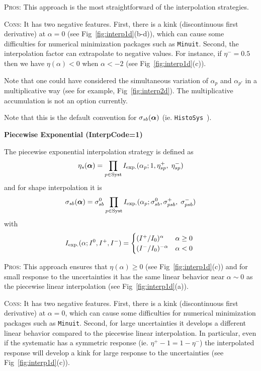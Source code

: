 \documentclass{cernrep}
\def\vec#1{\ifmmode
\mathchoice{\mbox{\boldmath$\displaystyle\bf#1$}}
{\mbox{\boldmath$\textstyle\bf#1$}}
{\mbox{\boldmath$\scriptstyle\bf#1$}}
{\mbox{\boldmath$\scriptscriptstyle\bf#1$}}\else
{\mbox{\boldmath$\bf#1$}}\fi}
\newcommand{\HS}{\texttt{HistoSys}}
\begin{document}
\textsc{Pros:} This approach is the most straightforward of the interpolation strategies.

\textsc{Cons:} It has two negative features.  First, there is a kink (discontinuous first derivative) at $\alpha=0$ (see Fig~\ref{fig:interp1d}(b-d)), which can cause some difficulties for numerical minimization packages such as \texttt{Minuit}.  Second, the interpolation factor can extrapolate to negative values.  For instance, if $\eta^-=0.5$ then  we have $\eta(\alpha)<0$  when $\alpha<-2$  (see Fig~\ref{fig:interp1d}(c)).  

Note that one could have considered the simultaneous variation of $\alpha_{p}$ and $\alpha_{p'}$ in a multiplicative way (see for example, Fig~\ref{fig:interp2d}).  The multiplicative accumulation is not an option currently.

Note that this is the default convention for $\sigma_{sb}(\vec{\alpha})$ (ie. \HS\ ).

{\flushleft\bf Piecewise Exponential (InterpCode=1)}

The piecewise exponential interpolation strategy is defined as
\begin{equation}
\eta_s ({\boldsymbol \alpha}) = \prod_{p\in\textrm{Syst}} I_{\rm exp.}(\alpha_p; 1,\eta_{sp}^+, \; \eta_{sp}^- ) 
\end{equation}
and for shape interpolation it is
\begin{equation}
\sigma_{sb} ({\boldsymbol \alpha}) = \sigma_{sb}^0 \prod_{p\in\textrm{Syst}} I_{\rm exp.}(\alpha_p;  \sigma_{sb}^0, \sigma_{psb}^+ ,\;
\sigma_{psb}^- )  
\end{equation}
with
\begin{equation}
 I_{\rm exp.}(\alpha;  I^0, I^+,I^- ) =
 \begin{cases}
     (I^+/I_0)^ \alpha  &  \text{$\alpha\ge 0$} \\
     (I^-/I_0)^{-\alpha}  &  \text{$\alpha<0$ }
 \end{cases}
\end{equation}

\textsc{Pros:} This approach ensures that $\eta(\alpha)\ge 0$ (see Fig~\ref{fig:interp1d}(c)) and for small response to the uncertainties it has the same linear behavior near $\alpha\sim 0$ as the piecewise linear interpolation (see Fig~\ref{fig:interp1d}(a)).

\textsc{Cons:} It has two negative features.  First, there is a kink (discontinuous first derivative) at $\alpha=0$, which can cause some difficulties for numerical minimization packages such as \texttt{Minuit}.  Second, for large uncertainties it develops a different linear behavior compared to the piecewise linear interpolation.  In particular, even if the systematic has a symmetric response (ie. $\eta^+-1 = 1-\eta^-$) the interpolated response will develop a kink for large response to the uncertainties  (see Fig~\ref{fig:interp1d}(c)).
\end{document}
